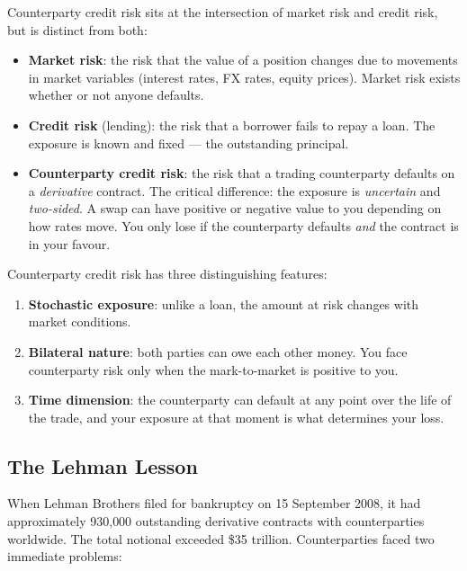 \documentclass[11pt, a4paper]{article}
\theoremstyle{definition}
\theoremstyle{plain}
\theoremstyle{remark}
\begin{document}
Counterparty credit risk sits at the intersection of market risk and credit risk,
but is distinct from both:

\begin{itemize}
    \item \textbf{Market risk}: the risk that the value of a position changes due to
          movements in market variables (interest rates, FX rates, equity prices).
          Market risk exists whether or not anyone defaults.
    \item \textbf{Credit risk} (lending): the risk that a borrower fails to repay a loan.
          The exposure is known and fixed --- the outstanding principal.
    \item \textbf{Counterparty credit risk}: the risk that a trading counterparty defaults
          on a \emph{derivative} contract.
          The critical difference: the exposure is \emph{uncertain} and \emph{two-sided}.
          A swap can have positive or negative value to you depending on how rates move.
          You only lose if the counterparty defaults \emph{and} the contract is in your favour.
\end{itemize}

\begin{keyidea}
Counterparty credit risk has three distinguishing features:
\begin{enumerate}
    \item \textbf{Stochastic exposure}: unlike a loan, the amount at risk changes with
          market conditions.
    \item \textbf{Bilateral nature}: both parties can owe each other money.
          You face counterparty risk only when the mark-to-market is positive to you.
    \item \textbf{Time dimension}: the counterparty can default at any point over the
          life of the trade, and your exposure at that moment is what determines your loss.
\end{enumerate}
\end{keyidea}

\subsection{The Lehman Lesson}

When Lehman Brothers filed for bankruptcy on 15 September 2008, it had approximately
930{,}000 outstanding derivative contracts with counterparties worldwide.
The total notional exceeded \$35 trillion.
Counterparties faced two immediate problems:
\end{document}
